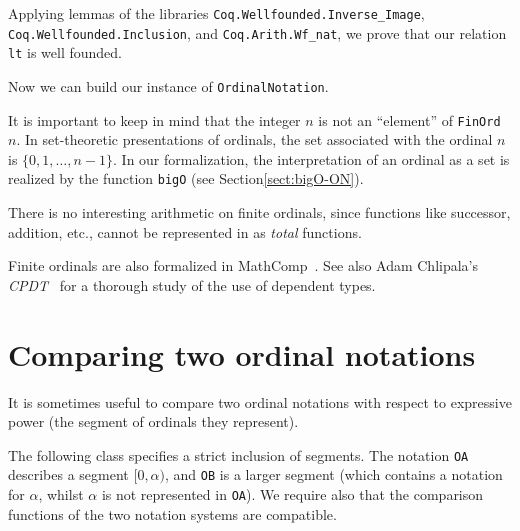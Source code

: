 



Applying lemmas of the libraries \texttt{Coq.Wellfounded.Inverse\_Image}, \linebreak
 \texttt{Coq.Wellfounded.Inclusion}, and \texttt{Coq.Arith.Wf\_nat}, we prove that our
relation \texttt{lt} is well founded.




Now we can build our instance of \texttt{OrdinalNotation}.



\begin{remark}
It is important to keep in mind  that the integer $n$ is not an ``element'' of \texttt{FinOrd $n$}. In set-theoretic presentations of ordinals, the set associated with the ordinal $n$ is $\{0,1,\dots,n-1\}$. 
In our formalization, the interpretation of an ordinal as a set is realized by the function \texttt{bigO} (see Section\vref{sect:bigO-ON}).
\end{remark}


\begin{remark}
 There is no interesting arithmetic on finite ordinals, since functions like successor, addition, etc.,  cannot be represented in \coq{} as \emph{total} functions.
\end{remark}

\begin{remark}
Finite ordinals are also formalized in MathComp~\cite{MCB}.  See also Adam Chlipala's \emph{CPDT}~\cite{chlipalacpdt2011} for a thorough study of the use of dependent types.  
\end{remark}




\section{Comparing two ordinal notations}

It is sometimes useful to compare two ordinal notations with respect to expressive power
(the segment of ordinals  they represent). 

The following class specifies a strict inclusion of segments. The notation \texttt{OA} describes a segment $[0,\alpha)$, and \texttt{OB} is a larger segment (which contains a notation for $\alpha$, whilst $\alpha$ is not represented in \texttt{OA}). We require also  that the comparison functions of the two notation systems are compatible.

